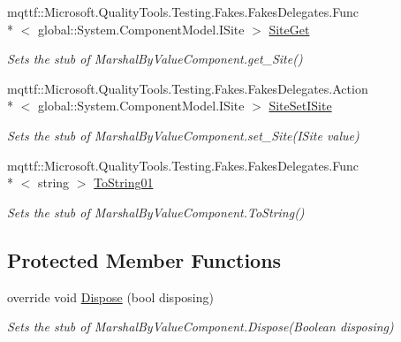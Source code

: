 \begin{DoxyCompactItemize}
mqttf\-::\-Microsoft.\-Quality\-Tools.\-Testing.\-Fakes.\-Fakes\-Delegates.\-Func\\*
$<$ global\-::\-System.\-Component\-Model.\-I\-Site $>$ \hyperlink{class_system_1_1_component_model_1_1_fakes_1_1_stub_marshal_by_value_component_aa3672722ecacaf73c4c02912f7ca2ef3}{Site\-Get}
\begin{DoxyCompactList}\small\item\em Sets the stub of Marshal\-By\-Value\-Component.\-get\-\_\-\-Site()\end{DoxyCompactList}\item 
mqttf\-::\-Microsoft.\-Quality\-Tools.\-Testing.\-Fakes.\-Fakes\-Delegates.\-Action\\*
$<$ global\-::\-System.\-Component\-Model.\-I\-Site $>$ \hyperlink{class_system_1_1_component_model_1_1_fakes_1_1_stub_marshal_by_value_component_ab14cf98fd24f43de18954c3b2d92c05c}{Site\-Set\-I\-Site}
\begin{DoxyCompactList}\small\item\em Sets the stub of Marshal\-By\-Value\-Component.\-set\-\_\-\-Site(\-I\-Site value)\end{DoxyCompactList}\item 
mqttf\-::\-Microsoft.\-Quality\-Tools.\-Testing.\-Fakes.\-Fakes\-Delegates.\-Func\\*
$<$ string $>$ \hyperlink{class_system_1_1_component_model_1_1_fakes_1_1_stub_marshal_by_value_component_aabc48fc5d4189d60f95879e01832d63e}{To\-String01}
\begin{DoxyCompactList}\small\item\em Sets the stub of Marshal\-By\-Value\-Component.\-To\-String()\end{DoxyCompactList}\end{DoxyCompactItemize}
\subsection*{Protected Member Functions}
\begin{DoxyCompactItemize}
\item 
override void \hyperlink{class_system_1_1_component_model_1_1_fakes_1_1_stub_marshal_by_value_component_af67c3262f08b08b3520f9ad4130f6d61}{Dispose} (bool disposing)
\begin{DoxyCompactList}\small\item\em Sets the stub of Marshal\-By\-Value\-Component.\-Dispose(\-Boolean disposing)\end{DoxyCompactList}\end{DoxyCompactItemize}
